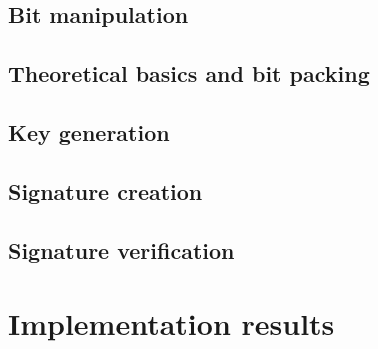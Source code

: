 \subsection{Bit manipulation}
\label{subsec:dil_bit_man}


\subsection{Theoretical basics and bit packing}
\label{subsec:dil_bit_pack}


\subsection{Key generation}
\label{subsec:dil_keygen}


\subsection{Signature creation}
\label{subsec:dil_sign}


\subsection{Signature verification}
\label{subsec:dil_verify}


\section{Implementation results}
\label{sec:lattice_performance_measuring}


